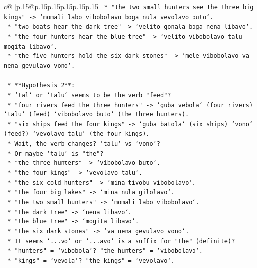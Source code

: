 \documentclass{article}
\begin{document}
{\begin{supertabular}{c@{$\;$}|p{.15\linewidth}@{}p{.15\linewidth}p{.15\linewidth}p{.15\linewidth}p{.15\linewidth}p{.15\linewidth}}
{{{\texttt{        *   "the two small hunters see the three big kings" {-}> `momali labo vibobolavo boga nula vevolavo buto`.} \\
\texttt{        *   "two boats hear the dark tree" {-}> `velito gonala boga nena libavo`.} \\
\texttt{        *   "the four hunters hear the blue tree" {-}> `velito vibobolavo talu mogita libavo`.} \\
\texttt{        *   "the five hunters hold the six dark stones" {-}> `mele vibobolavo va nena gevulavo vono`.} \\
\\ 
\texttt{    *   **Hypothesis 2**:} \\
\texttt{        *   `tal` or `talu` seems to be the verb "feed"?} \\
\texttt{        *   "four rivers feed the three hunters" {-}> `guba vebola` (four rivers) `talu` (feed) `vibobolavo buto` (the three hunters).} \\
\texttt{        *   "six ships feed the four kings" {-}> `guba batola` (six ships) `vono` (feed?) `vevolavo talu` (the four kings).} \\
\texttt{        *   Wait, the verb changes? `talu` vs `vono`?} \\
\texttt{        *   Or maybe `talu` is "the"?} \\
\texttt{        *   "the three hunters" {-}> `vibobolavo buto`.} \\
\texttt{        *   "the four kings" {-}> `vevolavo talu`.} \\
\texttt{        *   "the six cold hunters" {-}> `mina tivobu vibobolavo`.} \\
\texttt{        *   "the four big lakes" {-}> `mina nula gilolavo`.} \\
\texttt{        *   "the two small hunters" {-}> `momali labo vibobolavo`.} \\
\texttt{        *   "the dark tree" {-}> `nena libavo`.} \\
\texttt{        *   "the blue tree" {-}> `mogita libavo`.} \\
\texttt{        *   "the six dark stones" {-}> `va nena gevulavo vono`.} \\
\texttt{        *   It seems `...vo` or `...avo` is a suffix for "the" (definite)?} \\
\texttt{        *   "hunters" = `vibobola`? "the hunters" = `vibobolavo`.} \\
\texttt{        *   "kings" = `vevola`? "the kings" = `vevolavo`.} \\
}}}
\end{supertabular}}
\end{document}
